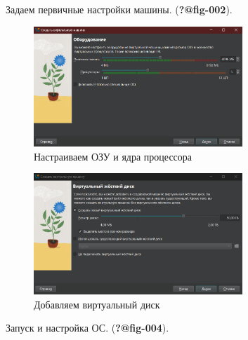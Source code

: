 \documentclass[
  12pt,
  a4paper,
  DIV=11,
  numbers=noendperiod]{scrreprt}
\begin{document}
Задаем первичные настройки машины. (\textbf{?@fig-002}).

\begin{figure}

{\centering \includegraphics[width=0.7\textwidth,height=\textheight]{image/2.png}

}

\caption{Настраиваем ОЗУ и ядра процессора}

\end{figure}%
\begin{figure}

{\centering \includegraphics[width=0.7\textwidth,height=\textheight]{image/3.png}

}

\caption{Добавляем виртуальный диск}

\end{figure}%

Запуск и настройка ОС. (\textbf{?@fig-004}).
\end{document}
